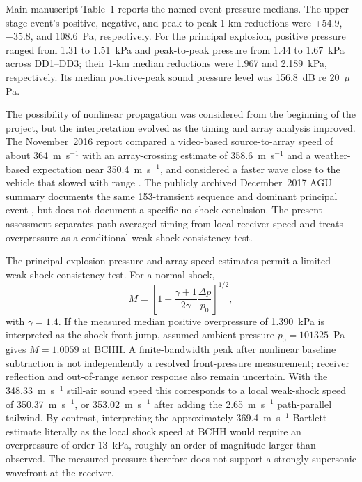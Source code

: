 \documentclass[]{seismica}
\begin{document}
Main-manuscript Table~1 reports the named-event pressure medians. The
upper-stage event's positive, negative, and peak-to-peak 1-km reductions were
+54.9, $-35.8$, and 108.6~Pa, respectively. For the principal explosion,
positive pressure ranged from 1.31 to 1.51~kPa and peak-to-peak pressure from
1.44 to 1.67~kPa across DD1--DD3; their 1-km median reductions were 1.967 and
2.189~kPa, respectively. Its median positive-peak sound pressure level was
156.8~dB re 20~$\mu$Pa.

The possibility of nonlinear propagation was considered from the beginning
of the project, but the interpretation evolved as the timing and array
analysis improved. The November~2016 report compared a video-based
source-to-array speed of about 364~m~s$^{-1}$ with an array-crossing estimate
of 358.6~m~s$^{-1}$ and a weather-based expectation near
350.4~m~s$^{-1}$, and considered a faster wave close to the vehicle that
slowed with range \citep{thompson_mcnutt_fireball_2016}. The publicly archived
December~2017 AGU summary documents the same 153-transient sequence and
dominant principal event \citep{thompson_agu_falcon9_2017}, but does not
document a specific no-shock conclusion. The present assessment separates
path-averaged timing from local receiver speed and treats overpressure as a
conditional weak-shock consistency test.

The principal-explosion pressure and array-speed estimates permit a limited
weak-shock consistency test. For a normal shock,
\begin{equation}
 M=\left[1+\frac{\gamma+1}{2\gamma}\frac{\Delta p}{p_0}\right]^{1/2},
\end{equation}
with $\gamma=1.4$. If the measured median positive overpressure of
1.390~kPa is interpreted as the shock-front jump, assumed ambient pressure
$p_0=101325$~Pa gives $M=1.0059$ at BCHH. A finite-bandwidth peak after
nonlinear baseline subtraction is not independently a resolved front-pressure
measurement; receiver reflection and out-of-range sensor response also remain
uncertain. With the 348.33~m~s$^{-1}$ still-air sound speed this corresponds
to a local weak-shock speed of 350.37~m~s$^{-1}$, or
353.02~m~s$^{-1}$ after adding the 2.65~m~s$^{-1}$ path-parallel tailwind.
By contrast, interpreting the approximately 369.4~m~s$^{-1}$ Bartlett
estimate literally as the local shock speed at BCHH would require an
overpressure of order 13~kPa, roughly an order of magnitude larger than
observed. The measured pressure therefore does not support a strongly
supersonic wavefront at the receiver.
\end{document}
